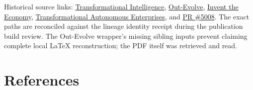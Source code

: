 \documentclass[10pt,letterpaper]{article}
\begin{document}
Historical source links:
\href{https://github.com/MontrealAI/AGI-Alpha-Agent-v0/blob/12770c22b4a9f90f2013bbfb64242f912ba5071e/docs/Transformational_Intelligence.tex}{Transformational
Intelligence},
\href{https://github.com/MontrealAI/AGI-Alpha-Agent-v0/blob/12770c22b4a9f90f2013bbfb64242f912ba5071e/docs/Out_Evolve.pdf}{Out-Evolve},
\href{https://github.com/MontrealAI/AGI-Alpha-Agent-v0/blob/12770c22b4a9f90f2013bbfb64242f912ba5071e/docs/Invent_the_Economy.tex}{Invent
the Economy},
\href{https://github.com/MontrealAI/AGI-Alpha-Agent-v0/blob/12770c22b4a9f90f2013bbfb64242f912ba5071e/docs/papers/transformational-autonomous-enterprises-v1.tex}{Transformational
Autonomous Enterprises}, and
\href{https://github.com/MontrealAI/AGI-Alpha-Agent-v0/pull/5008}{PR
\#5008}. The exact paths are reconciled against the lineage identity
receipt during the publication build review. The Out-Evolve wrapper's
missing sibling inputs prevent claiming complete local LaTeX
reconstruction; the PDF itself was retrieved and read.

\hypertarget{references}{%
\section{References}\label{references}}
\end{document}
